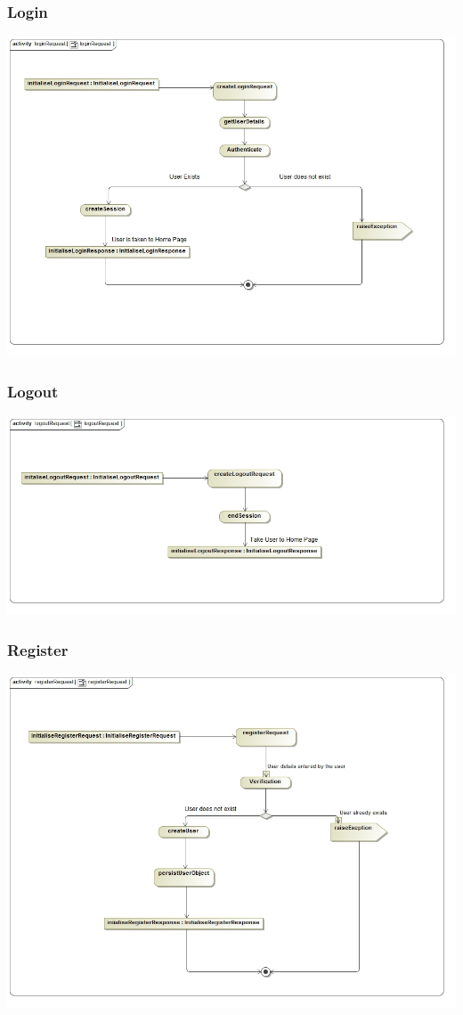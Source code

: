 \documentclass[a4paper,12pt]{article}
\begin{document}
\subsubsection{Login}
\includegraphics[width=1\textwidth]{./Images/processSpecification/Priscilla/loginRequest.jpg}
\subsubsection{Logout}
\includegraphics[width=1\textwidth]{./Images/processSpecification/Priscilla/logoutRequest.jpg}
\subsubsection{Register}
\includegraphics[width=1\textwidth]{./Images/processSpecification/Priscilla/registerRequest.jpg}
\end{document}

